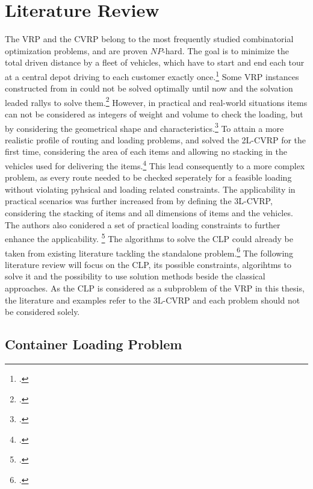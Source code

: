 \chapter{Literature Review}
\label{chap:literature_review}

The \gls{VRP} and the \gls{CVRP} belong to the most frequently studied combinatorial
optimization problems, and are proven $NP$-hard. The goal is to minimize the total driven distance
by a fleet of vehicles, which have to start and end each tour at a central depot driving to each
customer exactly once.\footcite[cf.][p.1]{gendreau_tabu_2008} Some \gls{VRP}
instances constructed from \citeauthor{solomon_algorithms_1987}
in \citeyear{solomon_algorithms_1987} could not be solved optimally until now and the
solvation leaded rallys to solve them.\footcite[cf.][]{solomon_algorithms_1987} However,
in practical and real-world situations items can not be considered as integers of weight
and volume to check the loading, but by considering the geometrical shape and characteristics.\footcite[cf.][p.1]{gendreau_tabu_2008}
To attain a more realistic profile of routing and loading problems, \cite{iori_exact_2004} and \cite{gendreau_tabu_2008}
solved the \gls{2L-CVRP} for the first time, considering the area of each items and allowing no stacking in
the vehicles used for delivering the items.\footcites()()[cf.][]{iori_exact_2004}[cf.][]{gendreau_tabu_2008}
This lead consequently to a more complex problem, as every route needed to be checked seperately for
a feasible loading without violating pyhsical and loading related constraints.
The applicability in practical scenarios was further increased from \cite{gendreau_tabu_2006} by defining
the \gls{3L-CVRP}, considering the stacking of items and all dimensions of items and the vehicles. The authors
also conidered a set of practical loading constraints to further enhance the applicability. \footcite[cf.][]{gendreau_tabu_2006}
The algorithms to solve the \gls{CLP} could already be taken from existing literature tackling the standalone
problem.\footcite[cf.][]{pisinger_heuristics_2002} The following literature review will focus
on the \gls{CLP}, its possible constraints, algorihtms to solve it and the possibility to use solution
methods beside the classical approaches. As the \gls{CLP} is considered as a subproblem of the \gls{VRP}
in this thesis, the literature and examples refer to the \gls{3L-CVRP} and each problem should not be
considered solely.


\section{Container Loading Problem}
\label{sec:clp_definition}

